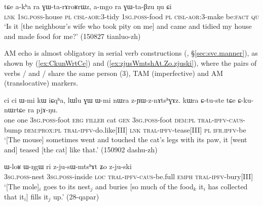 \begin{exe}
\ex \label{ex:GWtaBzu}
\gll  tɕe a-kʰa ra ɣɯ-ta-rɤroʁrɯz, 	a-mgo  ra ɣɯ-ta-βzu ŋu ɕi \\
\textsc{lnk} \textsc{1sg}.\textsc{poss}-house \textsc{pl} \textsc{cisl}-\textsc{aor}:3\flobv{}-tidy 
 \textsc{1sg}.\textsc{poss}-food \textsc{pl} \textsc{cisl}-\textsc{aor}:3\flobv{}-make be:\textsc{fact} \textsc{qu} \\ 
\glt `Is it [the neighbour's wife who took pity on me] and came and tidied my house and made food for me?'  (150827 tianluo-zh)
\end{exe}

AM echo is almost obligatory in serial verb constructions (\citealt[253--255]{jacques16complementation}, §\ref{sec:svc.manner}), as shown by (\ref{ex:CkunWrtCe}) and (\ref{ex:zjusWmtshAt.Zo.zjuski}), where the pairs of verbs  /  and   /  share the same person (3\flobv{}), TAM (imperfective) and AM (translocative) markers.

\begin{exe}
\ex \label{ex:CkunWrtCe}
\gll  ci ci ɯ-mi kɯ iɕqʰa, lɯlu ɣɯ ɯ-mi nɯra z-ɲɯ-z-nɤtsʰɣɤz. kɯra ɕ-tu-ste tɕe ɕ-ku-nɯrtɕe ra pjɤ-ŋu. \\
one one \textsc{3sg}.\textsc{poss}-foot \textsc{erg} \textsc{filler} cat \textsc{gen} \textsc{3sg}.\textsc{poss}-foot \textsc{dem}:\textsc{pl} \textsc{tral}-\textsc{ipfv}-\textsc{caus}-bump  \textsc{dem}:\textsc{prox}:\textsc{pl} \textsc{tral}-\textsc{ipfv}-do.like[III] \textsc{lnk}  \textsc{tral}-\textsc{ipfv}-tease[III] \textsc{pl} \textsc{ifr}.\textsc{ipfv}-be \\
\glt `[The mouse] sometimes went and touched the cat's legs with its paw, it [went and] teased [the cat] like that.' (150902 dashu-zh)
\end{exe} 

\begin{exe}
\ex \label{ex:zjusWmtshAt.Zo.zjuski}
\gll    ɯ-loʁ ɯ-ŋgɯ ri z-ju-sɯ-mtsʰɤt ʑo z-ju-ski \\
\textsc{3sg}.\textsc{poss}-nest \textsc{3sg}.\textsc{poss}-inside \textsc{loc} \textsc{tral}-\textsc{ipfv}-\textsc{caus}-be.full \textsc{emph} \textsc{tral}-\textsc{ipfv}-bury[III] \\
\glt `[The mole]$_i$ goes to its nest$_j$ and buries [so much of the food$_k$ it$_i$ has collected that it$_i$] fills it$_j$ up.' (28-qapar)
\end{exe} 

